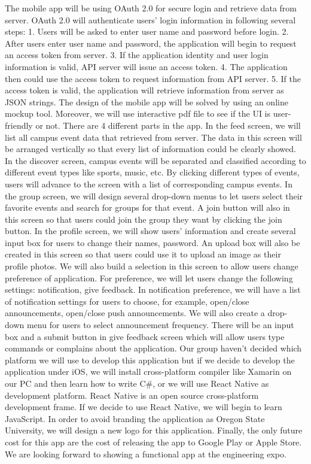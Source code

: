 \documentclass[10pt,letterpaper]{article}
\begin{document}
The mobile app will be using OAuth 2.0 for secure login and retrieve data from server. OAuth 2.0 will authenticate users’ login information in following several steps: 1. Users will be asked to enter user name and password before login. 2. After users enter user name and password, the application will begin to request an access token from server. 3. If the application identity and user login information is valid, API server will issue an access token. 4. The application then could use the access token to request information from API server. 5. If the access token is valid, the application will retrieve information from server as JSON strings. The design of the mobile app will be solved by using an online mockup tool. Moreover, we will use interactive pdf file to see if the UI is user-friendly or not. There are 4 different parts in the app. In the feed screen, we will list all campus event data that retrieved from server. The data in this screen will be arranged vertically so that every list of information could be clearly showed. In the discover screen, campus events will be separated and classified according to different event types like sports, music, etc. By clicking different types of events, users will advance to the screen with a list of corresponding campus events. In the group screen, we will design several drop-down menus to let users select their favorite events and search for groups for that event. A join button will also in this screen so that users could join the group they want by clicking the join button. In the profile screen, we will show users’ information and create several input box for users to change their names, password. An upload box will also be created in this screen so that users could use it to upload an image as their profile photos. We will also build a selection in this screen to allow users change preference of application. For preference, we will let users change the following settings: notification, give feedback. In notification preference, we will have a list of notification settings for users to choose, for example, open/close announcements, open/close push announcements. We will also create a drop-down menu for users to select announcement frequency. There will be an input box and a submit button in give feedback screen which will allow users type commands or complains about the application. Our group haven’t decided which platform we will use to develop this application but if we decide to develop the application under iOS, we will install cross-platform compiler like Xamarin on our PC and then learn how to write C\#, or we will use React Native as development platform. React Native is an open source cross-platform development frame. If we decide to use React Native, we will begin to learn JavaScript. In order to avoid branding the application as Oregon State University, we will design a new logo for this application.  Finally, the only future cost for this app are the cost of releasing the app to Google Play or Apple Store. We are looking forward to showing a functional app at the engineering expo.\\
\end{document}
